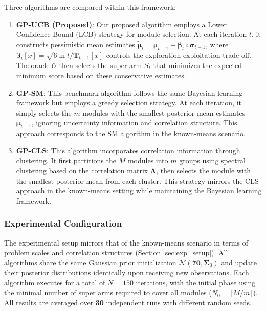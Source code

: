 \documentclass[opre,sglanonrev]{informs4}
\begin{document}
Three algorithms are compared within this framework:

\begin{enumerate}
    \item \textbf{GP-UCB (Proposed)}: Our proposed algorithm employs a Lower Confidence Bound (LCB) strategy for module selection. At each iteration $t$, it constructs pessimistic mean estimates $\boldsymbol{\tilde{\mu}}_t = \boldsymbol{\mu}_{t-1} - \boldsymbol{\beta}_t \circ \boldsymbol{\sigma}_{t-1}$, where $\boldsymbol{\beta}_t[x] = \sqrt{6 \ln t / \mathbf{T}_{t-1}[x]}$ controls the exploration-exploitation trade-off. The oracle $\mathcal{O}$ then selects the super arm $S_t$ that minimizes the expected minimum score based on these conservative estimates.

    \item \textbf{GP-SM}: This benchmark algorithm follows the same Bayesian learning framework but employs a greedy selection strategy. At each iteration, it simply selects the $m$ modules with the smallest posterior mean estimates $\boldsymbol{\mu}_{t-1}$, ignoring uncertainty information and correlation structure. This approach corresponds to the SM algorithm in the known-means scenario.

    \item \textbf{GP-CLS}: This algorithm incorporates correlation information through clustering. It first partitions the $M$ modules into $m$ groups using spectral clustering based on the correlation matrix $\boldsymbol{\Lambda}$, then selects the module with the smallest posterior mean from each cluster. This strategy mirrors the CLS approach in the known-means setting while maintaining the Bayesian learning framework.
\end{enumerate}

\subsubsection{Experimental Configuration}

The experimental setup mirrors that of the known-means scenario in terms of problem scales and correlation structures (Section \ref{sec:exp_setup}). All algorithms share the same Gaussian prior initialization $\mathcal{N}(\mathbf{70}, \mathbf{\Sigma}_0)$ and update their posterior distributions identically upon receiving new observations. Each algorithm executes for a total of $N = 150$ iterations, with the initial phase using the minimal number of super arms required to cover all modules ($N_0 = \lceil M/m \rceil$).
All results are averaged over \textbf{30} independent runs with different random seeds.
\end{document}

